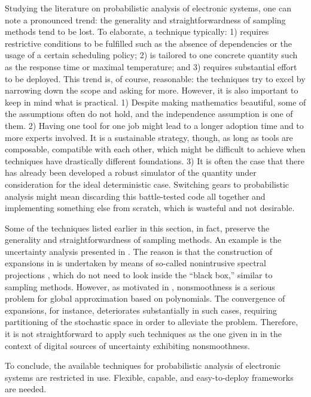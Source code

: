 Studying the literature on probabilistic analysis of electronic systems, one can
note a pronounced trend: the generality and straightforwardness of sampling
methods tend to be lost. To elaborate, a technique typically: 1) requires
restrictive conditions to be fulfilled such as the absence of dependencies or
the usage of a certain scheduling policy; 2) is tailored to one concrete
quantity such as the response time or maximal temperature; and 3) requires
substantial effort to be deployed. This trend is, of course, reasonable: the
techniques try to excel by narrowing down the scope and asking for more.
However, it is also important to keep in mind what is practical. 1) Despite
making mathematics beautiful, some of the assumptions often do not hold, and the
independence assumption is one of them. 2) Having one tool for one job might
lead to a longer adoption time and to more experts involved. It is a sustainable
strategy, though, as long as tools are composable, compatible with each other,
which might be difficult to achieve when techniques have drastically different
foundations. 3) It is often the case that there has already been developed a
robust simulator of the quantity under consideration for the ideal deterministic
case. Switching gears to probabilistic analysis might mean discarding this
battle-tested code all together and implementing something else from scratch,
which is wasteful and not desirable.

Some of the techniques listed earlier in this section, in fact, preserve the
generality and straightforwardness of sampling methods. An example is the
uncertainty analysis presented in \cite{ukhov2015}. The reason is that the
construction of  expansions in \cite{ukhov2015} is undertaken by means
of so-called nonintrusive spectral projections \cite{xiu2010}, which do not need
to look inside the ``black box,'' similar to sampling methods. However, as
motivated in , nonsmoothness is a serious problem for global
approximation based on polynomials. The convergence of  expansions, for
instance, deteriorates substantially in such cases, requiring partitioning of
the stochastic space in order to alleviate the problem. Therefore, it is not
straightforward to apply such techniques as the one given in \cite{ukhov2015} in
the context of digital sources of uncertainty exhibiting nonsmoothness.

To conclude, the available techniques for probabilistic analysis of electronic
systems are restricted in use. Flexible, capable, and easy-to-deploy frameworks
are needed.

